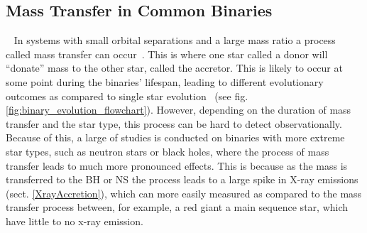 \documentclass[12pt, a4paper]{article}
\begin{document}
    \subsection{Mass Transfer in Common Binaries}~\label{MassTransferinCommon}
    In systems with small orbital separations and a large mass ratio a process called mass transfer can occur~\parencite{TaurisvandenHeuvel+2023}. This is where one star called a donor will ``donate'' mass to the other star, called the accretor. This is likely to occur at some point during the binaries' lifespan, leading to different evolutionary outcomes as compared to single star evolution~\parencite{TaurisvandenHeuvel+2023} (see fig. \ref{fig:binary_evolution_flowchart}). However, depending on the duration of mass transfer and the star type, this process can be hard to detect observationally. Because of this, a large of studies is conducted on binaries with more extreme star types, such as neutron stars or black holes, where the process of mass transfer leads to much more pronounced effects. This is because as the mass is transferred to the BH or NS the process leads to a large spike in X-ray emissions (sect. \ref{XrayAccretion}), which can more easily measured as compared to the mass transfer process between, for example, a red giant a main sequence star, which have little to no x-ray emission. 
\end{document}
